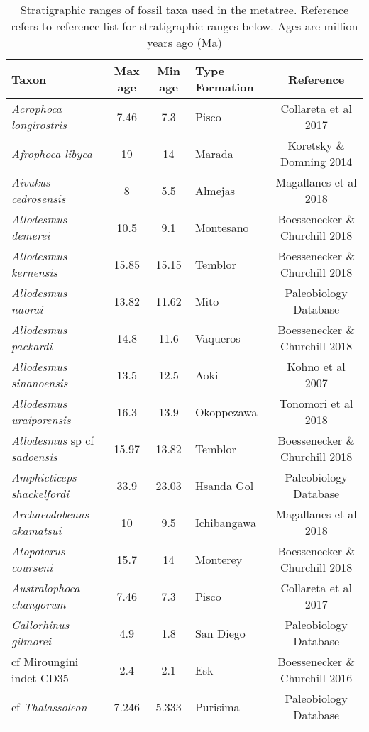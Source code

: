 \begin{longtable}{p{}cclc}

\caption{Stratigraphic ranges of fossil taxa used in the metatree. Reference refers to reference list for stratigraphic ranges below. Ages are million years ago (Ma)}\\

\hline
\textbf{Taxon} & \textbf{Max age} & \textbf{Min age} & \textbf{Type Formation} & \textbf{Reference}\\
\hline
\textit{Acrophoca longirostris} & 	7.46	&	7.3	&	Pisco	&	Collareta et al 2017	\\
\textit{Afrophoca libyca} & 	19	&	14	&	Marada	&	Koretsky \& Domning 2014	\\
\textit{Aivukus cedrosensis} & 	8	&	5.5	&	Almejas	&	Magallanes et al 2018	\\
\textit{Allodesmus demerei} & 	10.5	&	9.1	&	Montesano	&	Boessenecker \& Churchill 2018	\\
\textit{Allodesmus kernensis} & 	15.85	&	15.15	&	Temblor	&	Boessenecker \& Churchill 2018	\\
\textit{Allodesmus naorai} & 	13.82	&	11.62	&	Mito	&	Paleobiology Database	\\
\textit{Allodesmus packardi} & 	14.8	&	11.6	&	Vaqueros	&	Boessenecker \& Churchill 2018	\\
\textit{Allodesmus sinanoensis} & 	13.5	&	12.5	&	Aoki	&	Kohno et al 2007	\\
\textit{Allodesmus uraiporensis} & 	16.3	&	13.9	&	Okoppezawa	&	Tonomori et al 2018	\\
\textit{Allodesmus} sp cf \textit{sadoensis} & 	15.97	&	13.82	&	Temblor	&	Boessenecker \& Churchill 2018\\
\textit{Amphicticeps shackelfordi} & 	33.9	&	23.03	&	Hsanda Gol	&	Paleobiology Database	\\
\textit{Archaeodobenus akamatsui} & 	10	&	9.5	&	Ichibangawa	&	Magallanes et al 2018	\\
\textit{Atopotarus courseni} & 	15.7	&	14	&	Monterey	&	Boessenecker \& Churchill 2018	\\
\textit{Australophoca changorum} & 	7.46	&	7.3	&	Pisco	&	Collareta et al 2017	\\
\textit{Callorhinus gilmorei} & 	4.9	&	1.8	&	San Diego	&	Paleobiology Database	\\
cf Miroungini indet CD35 & 	2.4	&	2.1	&	Esk	&	Boessenecker \& Churchill 2016	\\
cf \textit{Thalassoleon} & 	7.246	&	5.333	&	Purisima	&	Paleobiology Database	\\

\end{longtable}
